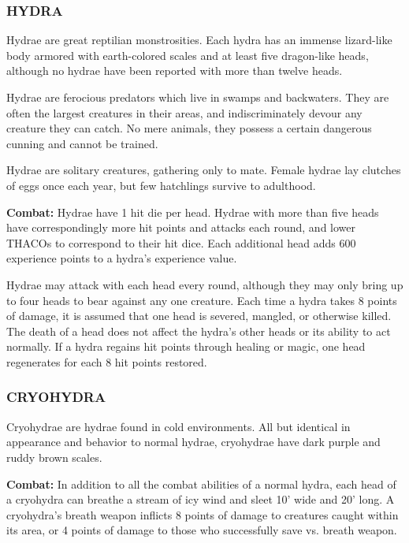 \begin{multicols}{2}

\subsubsection{HYDRA}

Hydrae are great reptilian monstrosities. Each hydra has an immense lizard-like body armored with earth-colored scales and at least five dragon-like heads, although no hydrae have been reported with more than twelve heads.

Hydrae are ferocious predators which live in swamps and backwaters. They are often the largest creatures in their areas, and indiscriminately devour any creature they can catch. No mere animals, they possess a certain dangerous cunning and cannot be trained.

Hydrae are solitary creatures, gathering only to mate. Female hydrae lay clutches of eggs once each year, but few hatchlings survive to adulthood.

\textbf{Combat:} Hydrae have 1 hit die per head. Hydrae with more than five heads have correspondingly more hit points and attacks each round, and lower THACOs to correspond to their hit dice. Each additional head adds 600 experience points to a hydra's experience value.

Hydrae may attack with each head every round, although they may only bring up to four heads to bear against any one creature. Each time a hydra takes 8 points of damage, it is assumed that one head is severed, mangled, or otherwise killed. The death of a head does not affect the hydra's other heads or its ability to act normally. If a hydra regains hit points through healing or magic, one head regenerates for each 8 hit points restored. 

\subsubsection{CRYOHYDRA}

Cryohydrae are hydrae found in cold environments. All but identical in appearance and behavior to normal hydrae, cryohydrae have dark purple and ruddy brown scales.

\textbf{Combat:} In addition to all the combat abilities of a normal hydra, each head of a cryohydra can breathe a stream of icy wind and sleet 10' wide and 20' long. A cryohydra's breath weapon inflicts 8 points of damage to creatures caught within its area, or 4 points of damage to those who successfully save vs. breath weapon.


\end{multicols}
